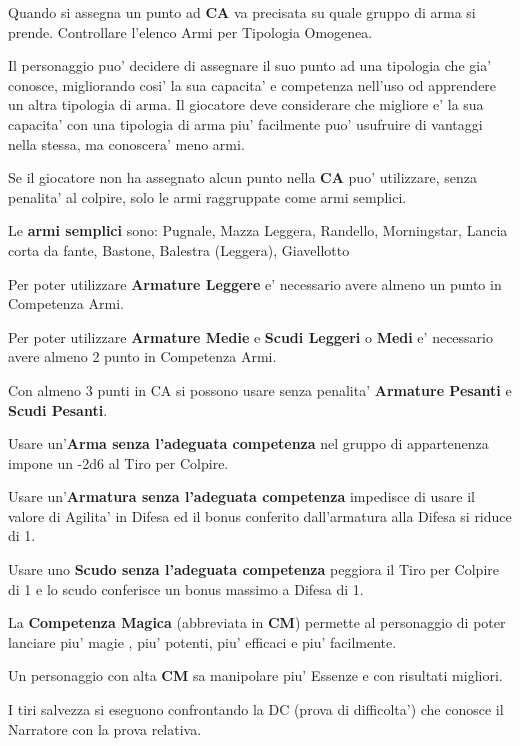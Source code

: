 \documentclass[a4paper,11pt,twoside,openany]{dndbook}
\begin{document}
Quando si assegna un punto ad \textbf{CA} va precisata su quale gruppo di arma si prende. Controllare l'elenco Armi per Tipologia Omogenea.

Il personaggio puo' decidere di assegnare il suo punto ad una tipologia che gia' conosce, migliorando cosi' la sua capacita' e competenza nell'uso od apprendere un altra tipologia di arma. Il giocatore deve considerare che migliore e' la sua capacita' con una tipologia di arma piu' facilmente puo' usufruire di vantaggi nella stessa, ma conoscera' meno armi.

Se il giocatore non ha assegnato alcun punto nella \textbf{CA} puo' utilizzare, senza penalita' al colpire, solo le armi raggruppate come armi semplici.

Le \textbf{armi semplici} sono: Pugnale, Mazza Leggera, Randello, Morningstar,
Lancia corta da fante, Bastone, Balestra (Leggera), Giavellotto

Per poter utilizzare \textbf{Armature Leggere} e' necessario avere almeno un punto in Competenza Armi.

Per poter utilizzare \textbf{Armature Medie} e \textbf{Scudi Leggeri} o \textbf{Medi} e' necessario avere almeno 2 punto in Competenza Armi.

Con almeno 3 punti in CA si possono usare senza penalita' \textbf{Armature Pesanti} e \textbf{Scudi Pesanti}.

Usare un'\textbf{Arma senza l'adeguata competenza} nel gruppo di appartenenza impone un -2d6 al Tiro per Colpire.

Usare un'\textbf{Armatura senza l'adeguata competenza} impedisce di usare il valore di Agilita' in Difesa ed il bonus conferito dall'armatura alla Difesa si riduce di 1.

Usare uno \textbf{Scudo senza l'adeguata competenza} peggiora il Tiro per Colpire di 1 e lo scudo conferisce un bonus massimo a Difesa di 1.

La \textbf{Competenza Magica} (abbreviata in \textbf{CM}) permette al personaggio di poter lanciare piu' magie , piu' potenti, piu' efficaci e piu' facilmente.

Un personaggio con alta \textbf{CM} sa manipolare piu' Essenze e con risultati migliori.

I tiri salvezza si eseguono confrontando la DC (prova di difficolta') che conosce il Narratore con la prova relativa.
\end{document}
